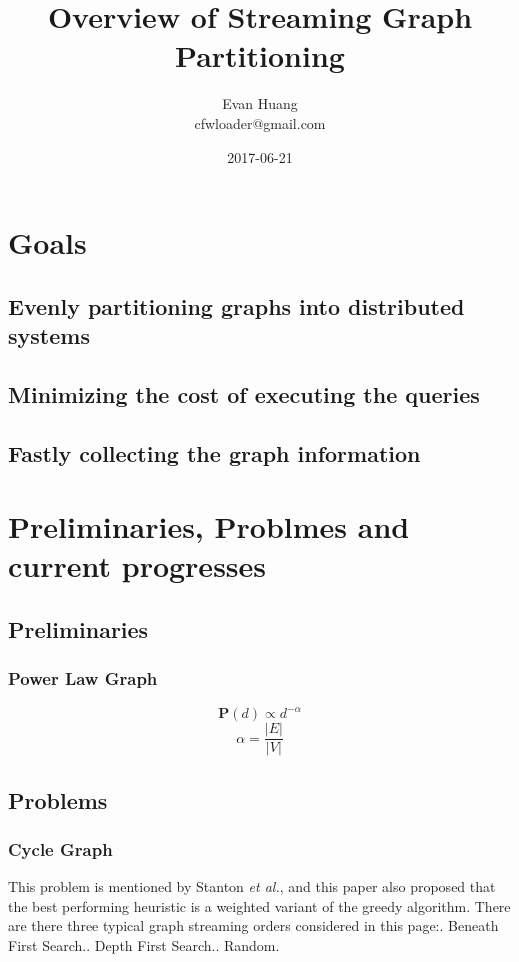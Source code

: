\documentclass{article}
\title{Overview of Streaming Graph Partitioning}
\date{2017-06-21}
\author{Evan Huang \\ cfwloader@gmail.com}
\begin{document}
	\maketitle

	\newpage

	\tableofcontents


	\newpage
	\section{Goals}
	\subsection{Evenly partitioning graphs into distributed systems}
	\subsection{Minimizing the cost of executing the queries}
	\subsection{Fastly collecting the graph information}

	\newpage
	\section{Preliminaries, Problmes and current progresses}
	\subsection{Preliminaries}
	\subsubsection{Power Law Graph}
	\begin{equation}
		\textbf{P}(d) \propto d^{-\alpha}
	\end{equation}
	\begin{equation}\label{pwlformula}
		\alpha = \frac{|E|}{|V|}
	\end{equation}
	\subsection{Problems}
	\subsubsection{Cycle Graph}
	This problem is mentioned by Stanton \emph{et al.}\cite{stanton2012streaming}, and this paper also proposed that the best performing heuristic is a weighted variant of the greedy algorithm. There are there three typical graph streaming orders considered in this page:. Beneath First Search.. Depth First Search.. Random.\newline
\end{document}
